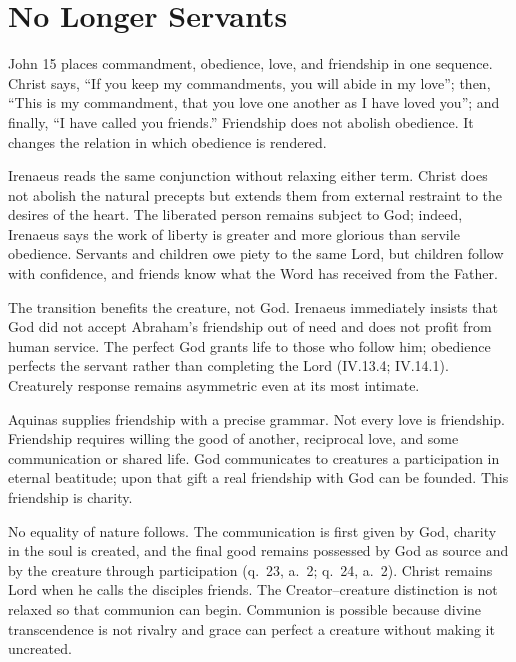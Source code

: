 \section{No Longer Servants}

John 15 places commandment, obedience, love, and friendship in one sequence. Christ says, ``If you keep my commandments, you will abide in my love''; then, ``This is my commandment, that you love one another as I have loved you''; and finally, ``I have called you friends.'' Friendship does not abolish obedience. It changes the relation in which obedience is rendered.

Irenaeus reads the same conjunction without relaxing either term. Christ does not abolish the natural precepts but extends them from external restraint to the desires of the heart. The liberated person remains subject to God; indeed, Irenaeus says the work of liberty is greater and more glorious than servile obedience. Servants and children owe piety to the same Lord, but children follow with confidence, and friends know what the Word has received from the Father.

The transition benefits the creature, not God. Irenaeus immediately insists that God did not accept Abraham's friendship out of need and does not profit from human service. The perfect God grants life to those who follow him; obedience perfects the servant rather than completing the Lord (IV.13.4; IV.14.1). Creaturely response remains asymmetric even at its most intimate.

Aquinas supplies friendship with a precise grammar. Not every love is friendship. Friendship requires willing the good of another, reciprocal love, and some communication or shared life. God communicates to creatures a participation in eternal beatitude; upon that gift a real friendship with God can be founded. This friendship is charity.

No equality of nature follows. The communication is first given by God, charity in the soul is created, and the final good remains possessed by God as source and by the creature through participation (q.~23, a.~2; q.~24, a.~2). Christ remains Lord when he calls the disciples friends. The Creator--creature distinction is not relaxed so that communion can begin. Communion is possible because divine transcendence is not rivalry and grace can perfect a creature without making it uncreated.

